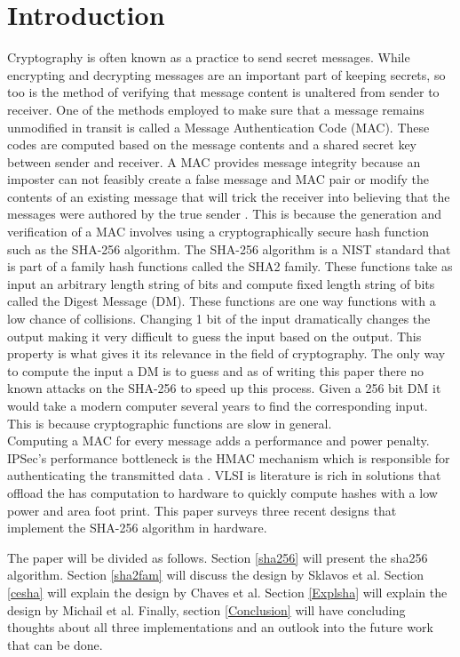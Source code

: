 \documentclass[conference]{IEEEtran}
\begin{document}
\section{Introduction} \label{introduction}
Cryptography is often known as a practice to send secret messages. While encrypting and decrypting messages are an important part of keeping secrets, so too is the method of verifying that message content is unaltered from sender to receiver. One of the methods employed to make sure that a message remains unmodified in transit is called a Message Authentication Code (MAC). These codes are computed based on the message contents and a shared secret key between sender and receiver. A MAC provides message integrity because an imposter can not feasibly create a false message and MAC pair or modify the contents of an existing message that will trick the receiver into believing that the messages were authored by the true sender \cite{schneier}. This is because the generation and verification of a MAC involves using a cryptographically secure hash function such as the SHA-256 algorithm. The SHA-256 algorithm is a NIST standard that is part of a family hash functions called the SHA2 family. These functions take as input an arbitrary length string of bits and compute fixed length string of bits called the Digest Message (DM). These functions are one way functions with a low chance of collisions. Changing 1 bit of the input dramatically changes the output making it very difficult to guess the input based on the output. This property is what gives it its relevance in the field of cryptography. The only way to compute the input a DM is to guess and as of writing this paper there no known attacks on the SHA-256 to speed up this process. Given a 256 bit DM it would take a modern computer several years to find the corresponding input. This is because cryptographic functions are slow in general.\\ Computing a MAC for every message adds a performance and power penalty. IPSec’s performance bottleneck is the HMAC mechanism which
is responsible for authenticating the transmitted data \cite{michail}. VLSI is literature is rich in solutions that offload the has computation to hardware to quickly compute hashes with a low power and area foot print. This paper surveys three recent designs that implement the SHA-256 algorithm in hardware. 

The paper will be divided as follows. Section \ref{sha256} will present the sha256 algorithm. Section \ref{sha2fam} will discuss the design by Sklavos et al. Section \ref{cesha} will explain the design by Chaves et al. Section \ref{Explsha} will explain the design by Michail et al. Finally, section \ref{Conclusion} will have concluding thoughts about all three implementations and an outlook into the future work that can be done.
\end{document}
